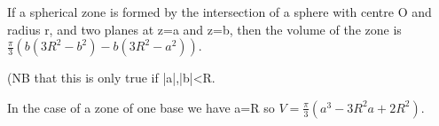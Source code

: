         If a spherical zone is formed by the intersection of a sphere with centre O
and radius r, and two planes at z=a and z=b, then the volume of the zone is
$ \frac{\pi}{3} ( {b} ( 3 {R} ^2 - {b}^2 ) 
- {b} ( 3 {R} ^2 - {a} ^2 ) ) . $
\par
(NB that this is only true if |a|,|b|<R.
\par
In the case of a zone of one base we have a=R so $ {V} =
\frac{\pi}{3} ( {a} ^3 - 3 {R} ^2 {a} + 2 {R} ^2 ) . $	